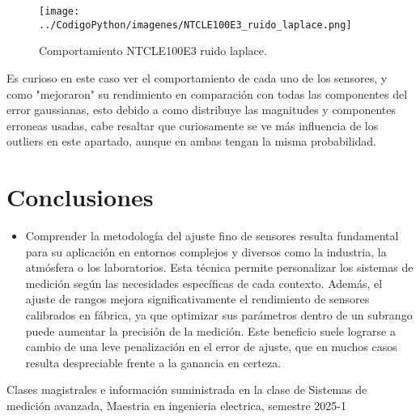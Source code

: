 \documentclass[conference]{IEEEtran}
\begin{document}
\begin{figure}[h!]
	\centering
	\texttt{[image: ../CodigoPython/imagenes/NTCLE100E3\_ruido\_laplace.png]}
	\caption{Comportamiento NTCLE100E3 ruido laplace.}
	\label{fig:NTCLE100E3_ruido_laplace}
\end{figure}

Es curioso en este caso ver el comportamiento de cada uno de los sensores, y como "mejoraron" su rendimiento en comparación con todas las componentes del error gaussianas, esto debido a como distribuye las magnitudes y componentes erroneas usadas, cabe resaltar que curiosamente se ve más influencia de los outliers en este apartado, aunque en ambas tengan la misma probabilidad.

\section{Conclusiones}

\begin{itemize}
	\item Comprender la metodología del ajuste fino de sensores resulta fundamental para su aplicación en entornos complejos y diversos como la industria, la atmósfera o los laboratorios. Esta técnica permite personalizar los sistemas de medición según las necesidades específicas de cada contexto. Además, el ajuste de rangos mejora significativamente el rendimiento de sensores calibrados en fábrica, ya que optimizar sus parámetros dentro de un subrango puede aumentar la precisión de la medición. Este beneficio suele lograrse a cambio de una leve penalización en el error de ajuste, que en muchos casos resulta despreciable frente a la ganancia en certeza.
\end{itemize}

\begin{thebibliography}{00}

\item Clases magistrales e información suministrada en la clase de Sistemas de medición avanzada, Maestria en ingenieria electrica, semestre 2025-1

\end{thebibliography}
\end{document}
